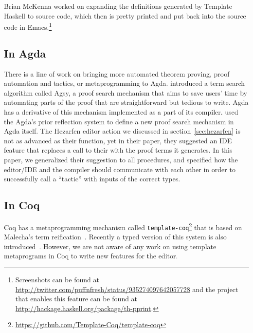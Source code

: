 Brian McKenna worked on expanding the definitions generated by Template Haskell
to source code, which then is pretty printed and put back into the source code
in Emacs.\footnote{Screenshots can be found at
\url{http://twitter.com/puffnfresh/status/935274097642057728} and the project
that enables this feature can be found at
\url{http://hackage.haskell.org/package/th-pprint}.}

\subsection{In Agda}

There is a line of work on bringing more automated theorem proving,
proof automation and tactics, or metaprogramming to Agda.
\citet{agsy} introduced a term search algorithm called
Agsy, a proof search mechanism that aims to save users' time by automating
parts of the proof that are straightforward but tedious to write.
Agda has a derivative of this mechanism implemented as a part of its compiler.
\citet{autoinagda} used the Agda's prior reflection system to define a
new proof search mechanism in Agda itself.
The Hezarfen editor action we discussed in section~\ref{sec:hezarfen} is not as advanced
as their  function, yet in their paper, they suggested an IDE feature
that replaces a call to their  with the proof terms it generates.
In this paper, we generalized their suggestion to all \Elab{} procedures, and specified
how the editor/IDE and the compiler should communicate with each other
in order to successfully call a ``tactic'' with inputs of the correct types.

\subsection{In Coq}

Coq has a metaprogramming mechanism called
\texttt{template-coq}\footnote{\url{https://github.com/Template-Coq/template-coq}} that is based on
Malecha's term reification~\cite{malecha-phd}. Recently a typed
version of this system is also introduced~\cite{typed-template-coq}.
However, we are not aware of any work on using template metaprograms in Coq to
write new features for the editor.


